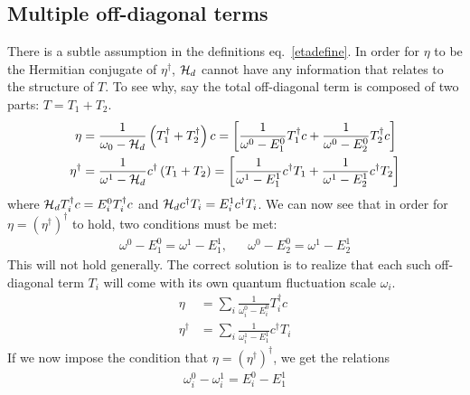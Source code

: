 \documentclass[12pt,twoside]{article}
\numberwithin{equation}{section}
\begin{document}
\subsection{Multiple off-diagonal terms}
There is a subtle assumption in the definitions eq.~\ref{etadefine}. In order for \(\eta\) to be the Hermitian conjugate of \(\eta^\dagger\), \(\mathcal{H}_d\) cannot have any information that relates to the structure of \(T\). To see why, say the total off-diagonal term is composed of two parts: \(T = T_1 + T_2\).
\begin{equation}\begin{aligned}
	\eta &= \frac{1}{\omega_0 - \mathcal{H}_d}\left(T_1^\dagger + T_2^\dagger\right)c = \left[\frac{1}{\omega^0 - E^0_1} T_1^\dagger c+ \frac{1}{\omega^0 - E^0_2}T_2^\dagger c\right]\\
	\eta^\dagger &= \frac{1}{\omega^1 - \mathcal{H}_d}c^\dagger\left(T_1 + T_2\right) = \left[\frac{1}{\omega^1 - E^1_1}c^\dagger T_1 + \frac{1}{\omega^1 - E^1_2} c^\dagger T_2\right]\\
\end{aligned}\end{equation}
where \(\mathcal{H}_d T_i^\dagger c = E^0_i T_i^\dagger c\) and \(\mathcal{H}_d  c^\dagger T_i = E^1_i  c^\dagger T_i\). We can now see that in order for \(\eta = \left(\eta^\dagger\right)^\dagger\) to hold, two conditions must be met:
\begin{equation}\begin{aligned}
	\omega^0 - E_1^0 = \omega^1 - E_1^1, && \omega^0 - E_2^0 = \omega^1 - E_2^1
\end{aligned}\end{equation}
This will not hold generally. The correct solution is to realize that each such off-diagonal term \(T_i\) will come with its own quantum fluctuation scale \(\omega_i\).
\begin{equation}\begin{aligned}
	\eta &= \sum_i \frac{1}{\omega^0_i - E^0_i} T_i^\dagger c\\
	\eta^\dagger &= \sum_i \frac{1}{\omega^1_i - E^1_1}c^\dagger T_i
\end{aligned}\end{equation}
If we now impose the condition that \(\eta =  \left( \eta^\dagger \right) ^\dagger\), we get the relations
\begin{equation}\begin{aligned}
	\omega^0_i - \omega^1_i = E^0_i - E^1_1
\end{aligned}\end{equation}
\end{document}
